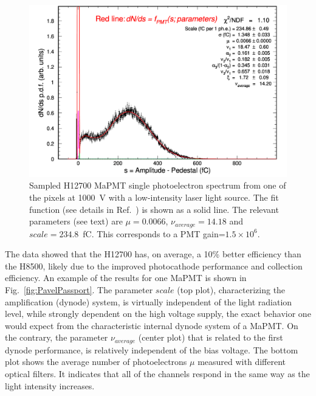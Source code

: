 \documentclass[5p,times,twocolumn]{elsarticle}
\def\MaPMT{MaPMT }
\begin{document}
\begin{figure}[ht]
	\centering
	\includegraphics[width=\linewidth]{H12700-r-W0-GA0982-w3-g064-v1000-t227-37.pdf}
	\caption{Sampled H12700 \MaPMT single photoelectron spectrum from one of the pixels at 1000~V with a low-intensity
          laser light source. The fit function (see details in Ref.~\cite{Pavel}) is shown as a solid line. 
          The relevant parameters (see text) are $\mu=0.0066$, $\nu_{average}=14.18$ and $scale=234.8$~fC. This corresponds
          to a PMT gain=$1.5 \times 10^6$.
          }
	\label{fig:SPEH12700}
\end{figure}

The data showed that the H12700 has, on average, a 10\% better efficiency than the H8500, likely due to the improved
photocathode performance and collection efficiency. An example of the results for one MaPMT is shown in
Fig.~\ref{fig:PavelPassport}. The parameter $scale$ (top plot), characterizing the amplification (dynode) system, is
virtually independent of the light radiation level, while strongly dependent on the high voltage supply, the exact behavior
one would expect from the characteristic internal dynode system of a MaPMT. On the contrary, the parameter $\nu_{average}$
(center plot) that is related to the first dynode performance, is relatively independent of the bias voltage. The bottom
plot shows the average number of photoelectrons $\mu$ measured with different optical filters. It indicates that all of
the channels respond in the same way as the light intensity increases.
\end{document}
